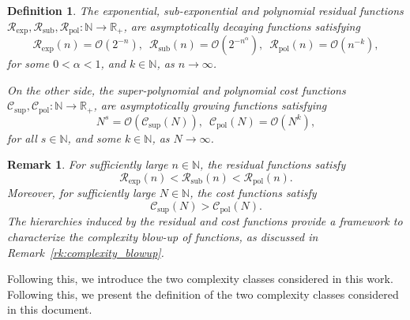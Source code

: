 \documentclass[pdflatex]{sn-jnl}%
\newtheorem{remark}[theorem]{Remark}
\newtheorem{definition}[theorem]{Definition}
\begin{document}
\begin{definition}
    The \emph{exponential, sub-exponential and polynomial residual functions} $\mathcal{R}_\mathrm{exp},\mathcal{R}_\mathrm{sub},\mathcal{R}_\mathrm{pol}:\mathbb{N}\rightarrow\mathbb{R}_+$, are asymptotically decaying functions satisfying
    \begin{equation}
    \mathcal{R}_\mathrm{exp}(n) =\mathcal{O}( 2^{-n}), 
    \,\,\, 
    \mathcal{R}_\mathrm{sub}(n) = \mathcal{O}(  2^{-n^\alpha}), 
    \,\,\, 
    \mathcal{R}_\mathrm{pol}(n)=\mathcal{O}(  n^{-k}),
\end{equation}
for some $0<\alpha<1$, and $k\in \mathbb{N}$, as $n\rightarrow\infty$.

On the other side, the \emph{super-polynomial and polynomial cost functions} $\mathcal{C}_\mathrm{sup},\mathcal{C}_\mathrm{pol}:\mathbb{N}\rightarrow\mathbb{R}_+$, are asymptotically growing functions satisfying
 \begin{equation}
    N^s= \mathcal{O}(\mathcal{C}_\mathrm{sup}(N)), 
    \,\,\, 
    \mathcal{C}_\mathrm{pol}(N) =\mathcal{O}(N^{k}),
\end{equation}
for all $s\in \mathbb{N}$, and some $k\in \mathbb{N}$, as $N\rightarrow\infty$.
\end{definition}
\begin{remark}
For sufficiently large $n \in \mathbb{N}$, the residual functions satisfy 
\begin{equation}
    \mathcal{R}_{\mathrm{exp}}(n) < \mathcal{R}_{\mathrm{sub}}(n) < \mathcal{R}_{\mathrm{pol}}(n).
\end{equation}
Moreover, for sufficiently large $N \in \mathbb{N}$, the cost functions satisfy
\begin{equation}
    \mathcal{C}_{\mathrm{sup}}(N) > \mathcal{C}_{\mathrm{pol}}(N).
\end{equation}
The hierarchies induced by the residual and cost functions provide a framework to characterize the complexity blow-up of functions, as discussed in Remark~\ref{rk:complexity_blowup}.
\end{remark}
Following this, we introduce the two complexity classes considered in this work.
Following this, we present the definition of the two complexity classes considered in this document. 
\end{document}
